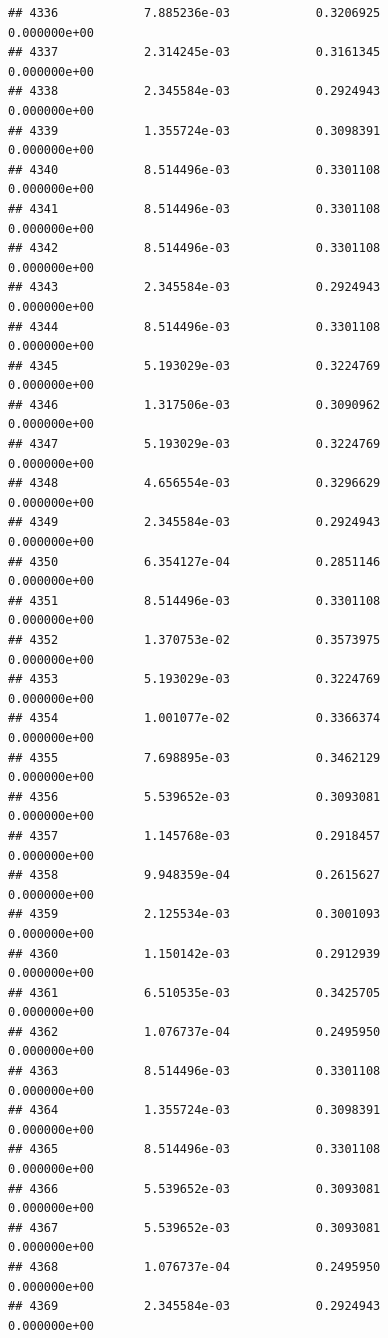 \documentclass[
]{article}
\begin{document}
\begin{verbatim}
## 4336            7.885236e-03            0.3206925            0.000000e+00
## 4337            2.314245e-03            0.3161345            0.000000e+00
## 4338            2.345584e-03            0.2924943            0.000000e+00
## 4339            1.355724e-03            0.3098391            0.000000e+00
## 4340            8.514496e-03            0.3301108            0.000000e+00
## 4341            8.514496e-03            0.3301108            0.000000e+00
## 4342            8.514496e-03            0.3301108            0.000000e+00
## 4343            2.345584e-03            0.2924943            0.000000e+00
## 4344            8.514496e-03            0.3301108            0.000000e+00
## 4345            5.193029e-03            0.3224769            0.000000e+00
## 4346            1.317506e-03            0.3090962            0.000000e+00
## 4347            5.193029e-03            0.3224769            0.000000e+00
## 4348            4.656554e-03            0.3296629            0.000000e+00
## 4349            2.345584e-03            0.2924943            0.000000e+00
## 4350            6.354127e-04            0.2851146            0.000000e+00
## 4351            8.514496e-03            0.3301108            0.000000e+00
## 4352            1.370753e-02            0.3573975            0.000000e+00
## 4353            5.193029e-03            0.3224769            0.000000e+00
## 4354            1.001077e-02            0.3366374            0.000000e+00
## 4355            7.698895e-03            0.3462129            0.000000e+00
## 4356            5.539652e-03            0.3093081            0.000000e+00
## 4357            1.145768e-03            0.2918457            0.000000e+00
## 4358            9.948359e-04            0.2615627            0.000000e+00
## 4359            2.125534e-03            0.3001093            0.000000e+00
## 4360            1.150142e-03            0.2912939            0.000000e+00
## 4361            6.510535e-03            0.3425705            0.000000e+00
## 4362            1.076737e-04            0.2495950            0.000000e+00
## 4363            8.514496e-03            0.3301108            0.000000e+00
## 4364            1.355724e-03            0.3098391            0.000000e+00
## 4365            8.514496e-03            0.3301108            0.000000e+00
## 4366            5.539652e-03            0.3093081            0.000000e+00
## 4367            5.539652e-03            0.3093081            0.000000e+00
## 4368            1.076737e-04            0.2495950            0.000000e+00
## 4369            2.345584e-03            0.2924943            0.000000e+00

\end{verbatim}
\end{document}
